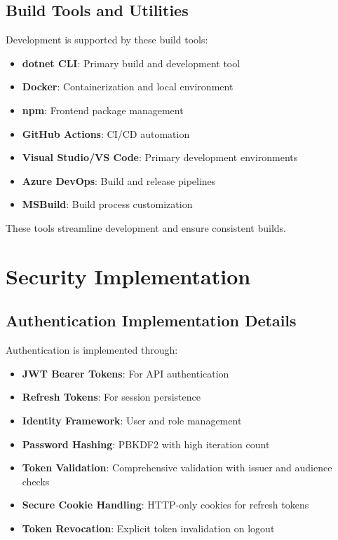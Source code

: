 \subsection{Build Tools and Utilities}
Development is supported by these build tools:
\begin{itemize}
    \item \textbf{dotnet CLI}: Primary build and development tool
    \item \textbf{Docker}: Containerization and local environment
    \item \textbf{npm}: Frontend package management
    \item \textbf{GitHub Actions}: CI/CD automation
    \item \textbf{Visual Studio/VS Code}: Primary development environments
    \item \textbf{Azure DevOps}: Build and release pipelines
    \item \textbf{MSBuild}: Build process customization
\end{itemize}

These tools streamline development and ensure consistent builds.

\section{Security Implementation}

\subsection{Authentication Implementation Details}
Authentication is implemented through:
\begin{itemize}
    \item \textbf{JWT Bearer Tokens}: For API authentication
    \item \textbf{Refresh Tokens}: For session persistence
    \item \textbf{Identity Framework}: User and role management
    \item \textbf{Password Hashing}: PBKDF2 with high iteration count
    \item \textbf{Token Validation}: Comprehensive validation with issuer and audience checks
    \item \textbf{Secure Cookie Handling}: HTTP-only cookies for refresh tokens
    \item \textbf{Token Revocation}: Explicit token invalidation on logout
\end{itemize}

